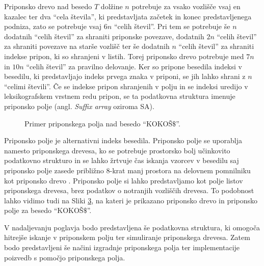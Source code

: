 Priponsko drevo nad besedo $T$ dolžine $n$ potrebuje za vsako vozlišče vsaj en kazalec ter dva \enquote{cela števila}, ki predstavljata začetek in konec predstavljenega podniza, zato se potrebuje vsaj $6n$ \enquote{celih števil}. Pri tem se potrebuje še $n$ dodatnih \enquote{celih števil} za shraniti priponske povezave, dodatnih $2n$ \enquote{celih števil} za shraniti povezave na starše vozlišč ter še dodatnih $n$ \enquote{celih števil} za shraniti indekse pripon, ki so shranjeni v listih. Torej priponsko drevo potrebuje med $7n$ in $10n$ \enquote{celih števil} za pravilno delovanje. Ker so pripone besedila indeksi v besedilu, ki predstavljajo indeks prvega znaka v priponi, se jih lahko shrani z $n$ \enquote{celimi števili}. Če se indekse pripon shranjenih v polju in se indeksi uredijo v leksikografskem vrstnem redu pripon, se ta podatkovna struktura imenuje priponsko polje (angl. \textit{Suffix array} oziroma SA).

\begin{figure}[htb]
    \begin{subfigure}[t]{\linewidth}
        
        
        \centering
        \subcaption*{}
        \label{fig:aSADrevo}
    \end{subfigure}
    \begin{subfigure}[t]{1\linewidth}        
        
        \centering
        \subcaption*{}
        \label{fig:aSAPolje}
    \end{subfigure}
    \caption{Primer priponskega polja nad besedo \enquote{KOKOŠ$\$$}.} 
    \label{fig:SuffuxArray}
\end{figure}

Priponsko polje je alternativni indeks besedila. Priponsko polje se uporablja namesto priponskega drevesa, ko se potrebuje prostorsko bolj učinkovito podatkovno strukturo in se lahko žrtvuje čas iskanja vzorcev v besedilu saj priponsko polje zasede približno 8-krat manj prostora na delovnem pomnilniku kot priponsko drevo \cite{Manber1990}. Priponsko polje si lahko predstavljamo kot polje listov priponskega drevesa, brez podatkov o notranjih vozliščih drevesa. To podobnost lahko vidimo tudi na Sliki \ref{fig:SuffuxArray}, na kateri je prikazano priponsko drevo in priponsko polje za besedo \enquote{KOKOŠ$\$$}.

V nadaljevanju poglavja bodo predstavljena še podatkovna struktura, ki omogoča hitrejše iskanje v priponskem polju ter simuliranje priponskega drevesa. Zatem bodo predstavljeni še načini izgradnje priponskega polja ter implementacije poizvedb s pomočjo priponskega polja.

